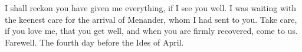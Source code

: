 

I shall reckon you have given me everything, if I see you well. I was waiting with the keenest care for the arrival of Menander, whom I had sent to you. Take care, if you love me, that you get well, and when you are firmly recovered, come to us. Farewell. The fourth day before the Ides of April.
